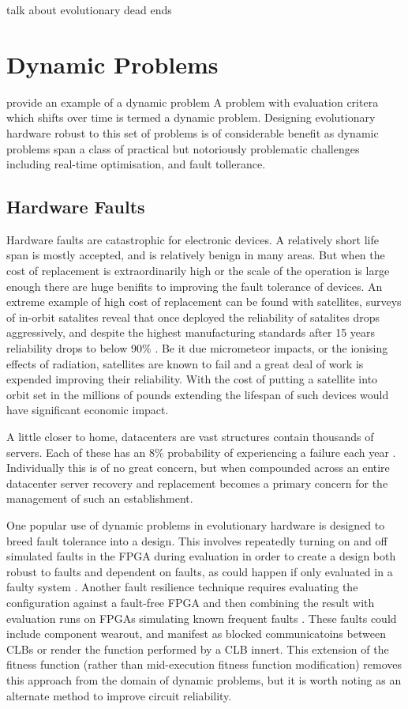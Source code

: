 \todo talk about evolutionary dead ends

\section{Dynamic Problems}

\todo provide an example of a dynamic problem
A problem with evaluation critera which shifts over time is termed a dynamic problem. Designing
evolutionary hardware robust to this set of problems is of considerable benefit as
dynamic problems span a class of practical but notoriously problematic challenges including
real-time optimisation, and fault tollerance.

\subsection{Hardware Faults}
Hardware faults are catastrophic for electronic devices. A relatively short life span is
mostly accepted, and is relatively benign in many areas. But when the cost of replacement is
extraordinarily high or the scale of the operation is large enough there are huge benifits
to improving the fault tolerance of devices. An extreme example of high cost of replacement
can be found with satellites, surveys of in-orbit satalites reveal that once deployed the
reliability of satalites drops aggressively, and despite the highest manufacturing standards
after 15 years reliability drops to below
90\% \cite{CASTET20091718}. Be it due micrometeor impacts,
or the ionising effects of radiation, satellites are known to fail and a great deal of
work is expended improving their reliability. With the cost
of putting a satellite into orbit set in the millions of pounds extending the lifespan
of such devices would have significant economic impact.

A little closer to home, datacenters are vast structures contain thousands of servers.
Each of these has an 8\% probability of experiencing a failure each year
 \cite{Vishwanath:2010:CCC:1807128.1807161}.
Individually this is of no great concern, but when compounded across an entire datacenter
server recovery and replacement becomes a primary concern for the management of
such an establishment.

One popular use of dynamic problems in evolutionary hardware is designed to breed
fault tolerance into a
design. This involves repeatedly turning on and off simulated faults in the FPGA during
evaluation in order to
create a design both robust to faults and dependent on faults, as could happen if
only evaluated in a faulty system \cite{651463}. Another fault resilience
technique requires evaluating the configuration
against a fault-free FPGA and then combining the result with evaluation runs on FPGAs
simulating known frequent faults \cite{651463}\cite{Keymeulen2000}. These faults could include component
wearout, and manifest as blocked communicatoins between CLBs or render the function
performed by a CLB innert. This extension of the fitness function (rather than
mid-execution fitness function modification) removes this approach from the domain of dynamic problems,
but it is worth noting as an alternate method to improve circuit reliability.

